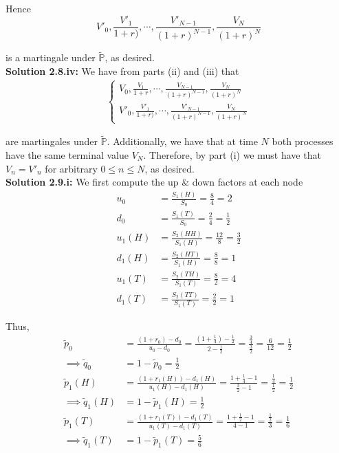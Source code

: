 \documentclass[12pt]{article}
\renewcommand{\P}{\mathbb P}
\begin{document}
Hence
\begin{equation*}
	V'_0, \frac{V'_1}{1 + r)}, \cdots, \frac{V'_{N - 1}}{(1 + r)^{N - 1}}, \frac{V_N}{(1 + r)^N}
\end{equation*}

is a martingale under $\tilde{\P}$, as desired. \\

{\bf Solution 2.8.iv:} We have from parts (ii) and (iii) that
\begin{align*}
\begin{cases}
	V_0, \frac{V_1}{1 + r}, \cdots, \frac{V_{N - 1}}{(1 + r)^{N - 1}}, \frac{V_N}{(1 + r)^N} \\
	V'_0, \frac{V'_1}{1 + r)}, \cdots, \frac{V'_{N - 1}}{(1 + r)^{N - 1}}, \frac{V_N}{(1 + r)^N}
\end{cases}
\end{align*}

are martingales under $\tilde{\P}$. Additionally, we have that at time $N$ both processes have the same terminal value $V_N$. Therefore, by part (i) we must have that $V_n = V'_n$ for arbitrary $0 \leq n \leq N$, as desired. \\

{\bf Solution 2.9.i:} We first compute the up \& down factors at each node
\begin{align*}
	u_0 &= \frac{S_1(H)}{S_0} = \frac{8}{4} = 2 \\
	d_0 &= \frac{S_1(T)}{S_0} = \frac{2}{4} = \frac{1}{2} \\
	u_1(H) &= \frac{S_2(HH)}{S_1(H)} = \frac{12}{8} = \frac{3}{2} \\
	d_1(H) &= \frac{S_2(HT)}{S_1(H)} = \frac{8}{8} = 1 \\
	u_1(T) &= \frac{S_2(TH)}{S_1(T)} = \frac{8}{2} = 4 \\
	d_1(T) &= \frac{S_2(TT)}{S_1(T)} = \frac{2}{2} = 1
\end{align*}

Thus, 
\begin{align*}
	\tilde{p}_0 &= \frac{(1 + r_0) - d_0}{u_0 - d_0} = \frac{(1 + \frac{1}{4}) - \frac{1}{2}}{2 - \frac{1}{2}} = \frac{ \frac{3}{4} }{ \frac{3}{2} } = \frac{6}{12} = \frac{1}{2} \\
	\implies \tilde{q}_0 &= 1 - \tilde{p}_0 = \frac{1}{2} \\
	\tilde{p}_1(H) &= \frac{(1 + r_1(H)) - d_1(H)}{u_1(H) - d_1(H)} = \frac{1 + \frac{1}{4} - 1}{\frac{3}{2} - 1} = \frac{ \frac{1}{4} }{ \frac{1}{2} } = \frac{1}{2} \\
	\implies \tilde{q}_1(H) &= 1 - \tilde{p}_1(H) = \frac{1}{2} \\
	\tilde{p}_1(T) &= \frac{(1 + r_1(T)) - d_1(T)}{u_1(T) - d_1(T)} = \frac{1 + \frac{1}{2} - 1}{4 - 1} = \frac{ \frac{1}{2} }{3} = \frac{1}{6} \\
	\implies \tilde{q}_1(T) &= 1 - \tilde{p}_1(T) = \frac{5}{6}
\end{align*}
\end{document}
